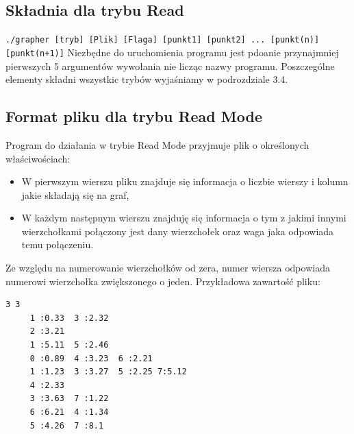 \documentclass[10pt, a4paper]{report}
\begin{document}
\subsection{Składnia dla trybu Read}
\texttt{./grapher [tryb] [Plik] [Flaga] [punkt1] [punkt2] ... [punkt(n)] [punkt(n+1)]}
\newline\newline Niezbędne do uruchomienia programu jest pdoanie przynajmniej pierwszych 5 argumentów wywołania nie licząc nazwy programu. 
\newline\newline Poszczególne elementy składni wszystkic trybów wyjaśniamy w podrozdziale 3.4.
\newpage

\subsection{Format pliku dla trybu Read Mode}
Program do działania w trybie Read Mode przyjmuje plik o określonych właściwościach:
\begin{itemize}
    \item W pierwszym wierszu pliku znajduje się informacja o liczbie wierszy i kolumn jakie składają się na graf,
    \item W każdym następnym wierszu znajduję się informacja o tym z jakimi innymi wierzchołkami połączony jest dany wierzchołek oraz waga jaka odpowiada temu połączeniu.
\end{itemize}
Ze względu na numerowanie wierzchołków od zera, numer wiersza odpowiada numerowi wierzchołka zwiększonego o jeden. 
\newline\newline Przykładowa zawartość pliku:

\begin{lstlisting}
3 3
     1 :0.33  3 :2.32
     2 :3.21
     1 :5.11  5 :2.46
     0 :0.89  4 :3.23  6 :2.21
     1 :1.23  3 :3.27  5 :2.25 7:5.12
     4 :2.33
     3 :3.63  7 :1.22
     6 :6.21  4 :1.34
     5 :4.26  7 :8.1 
\end{lstlisting}
\end{document}
